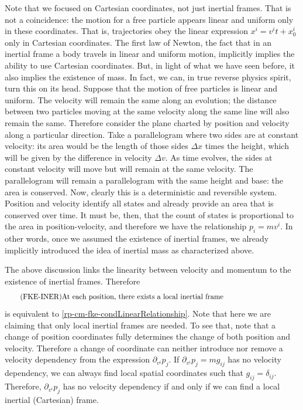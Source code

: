 Note that we focused on Cartesian coordinates, not just inertial frames. That is not a coincidence: the motion for a free particle appears linear and uniform only in these coordinates. That is, trajectories obey the linear expression $x^i = v^i t + x_0^i$ only in Cartesian coordinates. The first law of Newton, the fact that in an inertial frame a body travels in linear and uniform motion, implicitly implies the ability to use Cartesian coordinates. But, in light of what we have seen before, it also implies the existence of mass. In fact, we can, in true reverse physics spirit, turn this on its head. Suppose that the motion of free particles is linear and uniform. The velocity will remain the same along an evolution; the distance between two particles moving at the same velocity along the same line will also remain the same. Therefore consider the plane charted by  position and velocity along a particular direction. Take a parallelogram where two sides are at constant velocity: its area would be the length of those sides $\Delta x$ times the height, which will be given by the difference in velocity $\Delta v$. As time evolves, the sides at constant velocity will move but will remain at the same velocity. The parallelogram will remain a parallelogram with the same height and base: the area is conserved. Now, clearly this is a deterministic and reversible system. Position and velocity identify all states and already provide an area that is conserved over time. It must be, then, that the count of states is proportional to the area in position-velocity, and therefore we have the relationship $p_i=mv^i$. In other words, once we assumed the existence of inertial frames, we already implicitly introduced the idea of inertial mass as characterized above.

The above discussion links the linearity between velocity and momentum to the existence of inertial frames. Therefore
\begin{equation}
	\tag{FKE-INER}\label{rp-cm-fke-condInertial}
	\eqtext{At each position, there exists a local inertial frame}
\end{equation}
is equivalent to \ref{rp-cm-fke-condLinearRelationship}. Note that here we are claiming that only local inertial frames are needed. To see that, note that a change of position coordinates fully determines the change of both position and velocity. Therefore a change of coordinate can neither introduce nor remove a velocity dependency from the expression $\partial_{v^i} p_j$. If $\partial_{v^i} p_j = m g_{ij}$ has no velocity dependency, we can always find local spatial coordinates such that $g_{ij}=\delta_{ij}$. Therefore, $\partial_{v^i} p_j$ has no velocity dependency if and only if we can find a local inertial (Cartesian) frame.

